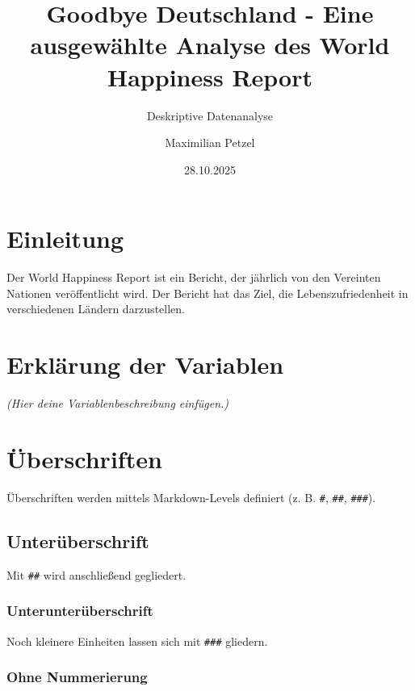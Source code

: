 \documentclass[
  fontsize=12pt,
  numbers=noenddot,
  parskip=half,
  listof=totoc,
  bibliography=totoc,
  headsepline=true,
  footsepline=false,
  DIV=12]{scrartcl}
\title{Goodbye Deutschland - Eine ausgewählte Analyse des World
Happiness Report}
\subtitle{Deskriptive Datenanalyse}
\author{Maximilian Petzel}
\date{28.10.2025}
\begin{document}
\maketitle

\thispagestyle{empty}
\newpage

\tableofcontents
\newpage

\hypertarget{einleitung}{%
\section{Einleitung}\label{einleitung}}

Der World Happiness Report ist ein Bericht, der jährlich von den
Vereinten Nationen veröffentlicht wird. Der Bericht hat das Ziel, die
Lebenszufriedenheit in verschiedenen Ländern darzustellen.

\hypertarget{erkluxe4rung-der-variablen}{%
\section{Erklärung der Variablen}\label{erkluxe4rung-der-variablen}}

\emph{(Hier deine Variablenbeschreibung einfügen.)}

\hypertarget{uxfcberschriften}{%
\section{Überschriften}\label{uxfcberschriften}}

Überschriften werden mittels Markdown-Levels definiert (z. B.
\texttt{\#}, \texttt{\#\#}, \texttt{\#\#\#}).

\hypertarget{unteruxfcberschrift}{%
\subsection{Unterüberschrift}\label{unteruxfcberschrift}}

Mit \texttt{\#\#} wird anschließend gegliedert.

\hypertarget{unterunteruxfcberschrift}{%
\subsubsection{Unterunterüberschrift}\label{unterunteruxfcberschrift}}

Noch kleinere Einheiten lassen sich mit \texttt{\#\#\#} gliedern.

\hypertarget{ohne-nummerierung}{%
\subsubsection{Ohne Nummerierung}\label{ohne-nummerierung}}
\end{document}
